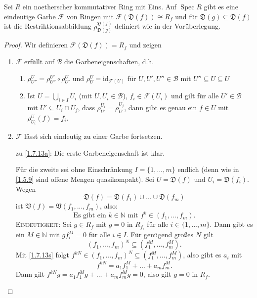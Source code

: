 \documentclass[a4paper,12pt]{scrbook}
\newtheorem{proof}{Beweis}
\def\V{\mathfrak{V}}
\newcommand{\D}{\mathfrak{D}}
\def\B{\mathcal{B}}
\newcommand{\F}{\mathcal{F}}
\newcommand{\Spec}{\operatorname{Spec}}
\newcommand{\id}{\mathrm{id}}
\renewcommand{\dotsc}{\ensuremath{\!...}}
\newcommand{\set}[1]{\ensuremath{\mathbb{#1}}}
\newcommand{\N}{\set{N}}
\begin{document}
\begin{prop}\label{1.7.13}
  Sei $R$ ein noetherscher kommutativer Ring mit Eins.
  Auf $\Spec R$ gibt es eine eindeutige Garbe $\F$ von Ringen mit $\F(\D(f))\cong R_f$ und für $\D(g)\subseteq
  \D(f)$ ist die Restriktionsabbildung $\rho_{\D(g)}^{\D(f)}$ definiert wie in der Vorüberlegung.
\end{prop}
\begin{proof}
  Wir definieren $\F(\D(f))=R_f$ und zeigen
  \begin{enumerate}
  \item{} $\F$ erfüllt auf $\B$ die Garbeneigenschaften, d.h.
    \begin{enumerate}[label=(\textsc{g}\arabic*)]
    \item\label{G1} $\rho_{U''}^U=\rho_{U''}^{U'}\circ\rho_{U'}^U$ und $\rho_U^U=\id_{\F(U)}$ für
      $U,U',U''\in\B$ mit $U''\subseteq U\subseteq U$
    \item\label{G2} Ist $U=\bigcup_{i\in I}U_i$ (mit $U,U_i\in\B$), $f_i\in\F(U_i)$ und gilt für alle
      $U'\in\B$ mit $U'\subseteq U_i\cap U_j$, dass $\rho_{U'}^{U_i}=\rho_{U'}^{U_j}$, dann gibt es genau ein
      $f\in U$ mit $\rho_{U_i}^U(f)=f_i$.
    \end{enumerate}
  \item{} $\F$ lässt sich eindeutig zu einer Garbe fortsetzen.
  \end{enumerate}
  \begin{enumerate}
  \item[zu] \ref{1.7.13a}: Die erste Garbeneigenschaft ist klar. 
  
  Für die zweite sei ohne Einschränkung $I=\{1,\dotsc,m\}$ endlich
    (denn wie in \cref{1.5.9} sind offene Mengen quasikompakt). Sei $U=\D(f)$ und $U_i=\D(f_i)$. Wegen
    \[\D(f)=\D(f_1)\cup\dotso\cup \D(f_m)\] ist $\V(f)=\V(f_1,\dotsc,f_m)$, also: 
    \begin{equation}\label{1.7.13s}\text{Es gibt ein }k\in\N\text{ mit }f^k\in(f_1,\dotsc,f_m).\tag{$*$}\end{equation}
%
    \textsc{Eindeutigkeit}: Sei $g\in R_f$ mit $g=0$ in $R_{f_i}$ für alle $i\in\{1,\dotsc,m\}$. Dann gibt es ein $M\in\N$ mit
    $gf_i^M=0$ für alle $i\in I$. Für genügend großes $N$ gilt 
    \[(f_1,\dotsc,f_m)^N\subseteq(f_1^M,\dotsc,f_m^M).\] 
    Mit \cref{1.7.13s}
    folgt $f^{kN}\in(f_1,\dotsc,f_m)^N\subseteq(f_1^M,\dotsc,f_m^M)$, also gibt es $a_i$ mit
    \[f^{kN}=a_1f_1^M+\dotso+a_mf_m^M.\]
    Dann gilt $f^{kN}g=a_1f_1^Mg+\dotso+a_mf_m^Mg=0$, also gilt $g=0$ in $R_f$.


\end{enumerate}
\end{proof}
\end{document}
